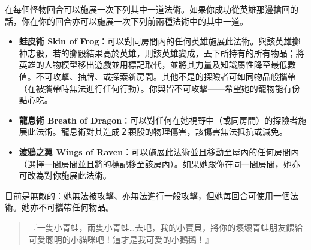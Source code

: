 在每個怪物回合可以施展一次下列其中一道法術。如果你成功從英雄那邊搶回的話，你在你的回合亦可以施展一次下列前兩種法術中的其中一道。
\begin{itemize}
	\item \textbf{蛙皮術 Skin of Frog}：可以對同房間內的任何英雄施展此法術。與該英雄擲神志骰，若的擲骰結果高於英雄，則該英雄變成，丟下所持有的所有物品；將英雄的人物模型移出遊戲並用標記取代，並將其力量及知識屬性降至最低數值。不可攻擊、抽牌、或探索新房間。其他不是的探險者可如同物品般攜帶（在被攜帶時無法進行任何行動）。你與皆不可攻擊——希望她的寵物能有份點心吃。
	\item \textbf{龍息術 Breath of Dragon}：可以對任何在她視野中（或同房間）的探險者施展此法術。龍息術對其造成２顆骰的物理傷害，該傷害無法抵抗或減免。
	\item \textbf{渡鴉之翼 Wings of Raven}：可以施展此法術並且移動至屋內的任何房間內（選擇一間房間並且將的標記移至該房內）。如果她跟你在同一間房間，她亦可改為對你施展此法術。
\end{itemize}

目前是無敵的：她無法被攻擊、亦無法進行一般攻擊，但她每回合可使用一個法術。她亦不可攜帶任何物品。

\begin{HauntStory}
	\begin{quote}
		『一隻小青蛙，兩隻小青蛙…去吧，我的小寶貝，將你的壞壞青蛙朋友餵給可愛聰明的小貓咪吧！這才是我可愛的小鵝鵝！』
	\end{quote}
\end{HauntStory}
